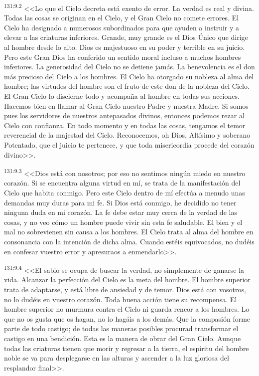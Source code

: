 \par 
\textsuperscript{131:9.2} <<Lo que el Cielo decreta está exento de error. La verdad es real y divina. Todas las cosas se originan en el Cielo, y el Gran Cielo no comete errores. El Cielo ha designado a numerosos subordinados para que ayuden a instruir y a elevar a las criaturas inferiores. Grande, muy grande es el Dios Único que dirige al hombre desde lo alto. Dios es majestuoso en su poder y terrible en su juicio. Pero este Gran Dios ha conferido un sentido moral incluso a muchos hombres inferiores. La generosidad del Cielo no se detiene jamás. La benevolencia es el don más precioso del Cielo a los hombres. El Cielo ha otorgado su nobleza al alma del hombre; las virtudes del hombre son el fruto de este don de la nobleza del Cielo. El Gran Cielo lo discierne todo y acompaña al hombre en todas sus acciones. Hacemos bien en llamar al Gran Cielo nuestro Padre y nuestra Madre. Si somos pues los servidores de nuestros antepasados divinos, entonces podemos rezar al Cielo con confianza. En todo momento y en todas las cosas, tengamos el temor reverencial de la majestad del Cielo. Reconocemos, oh Dios, Altísimo y soberano Potentado, que el juicio te pertenece, y que toda misericordia procede del corazón divino>>.

\par 
\textsuperscript{131:9.3} <<Dios está con nosotros; por eso no sentimos ningún miedo en nuestro corazón. Si se encuentra alguna virtud en mí, se trata de la manifestación del Cielo que habita conmigo. Pero este Cielo dentro de mí efectúa a menudo unas demandas muy duras para mi fe. Si Dios está conmigo, he decidido no tener ninguna duda en mi corazón. La fe debe estar muy cerca de la verdad de las cosas, y no veo cómo un hombre puede vivir sin esta fe saludable. El bien y el mal no sobrevienen sin causa a los hombres. El Cielo trata al alma del hombre en consonancia con la intención de dicha alma. Cuando estéis equivocados, no dudéis en confesar vuestro error y apresuraos a enmendarlo>>.

\par 
\textsuperscript{131:9.4} <<El sabio se ocupa de buscar la verdad, no simplemente de ganarse la vida. Alcanzar la perfección del Cielo es la meta del hombre. El hombre superior trata de adaptarse, y está libre de ansiedad y de temor. Dios está con vosotros, no lo dudéis en vuestro corazón. Toda buena acción tiene su recompensa. El hombre superior no murmura contra el Cielo ni guarda rencor a los hombres. Lo que no os gusta que os hagan, no lo hagáis a los demás. Que la compasión forme parte de todo castigo; de todas las maneras posibles procurad transformar el castigo en una bendición. Esta es la manera de obrar del Gran Cielo. Aunque todas las criaturas tienen que morir y regresar a la tierra, el espíritu del hombre noble se va para desplegarse en las alturas y ascender a la luz gloriosa del resplandor final>>.

